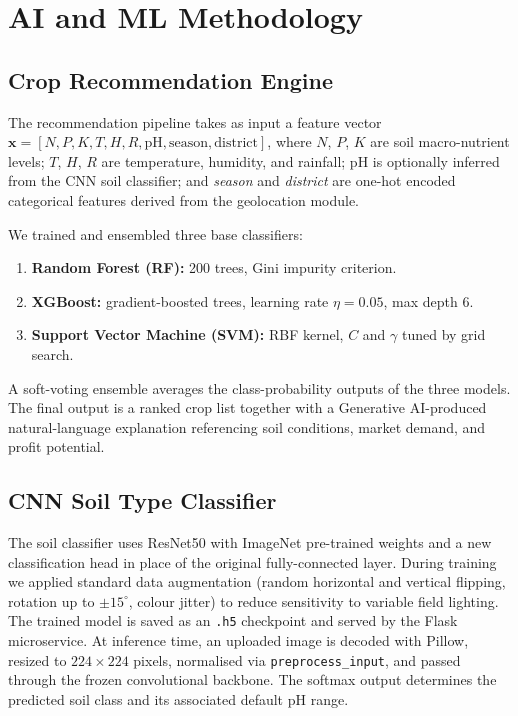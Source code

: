 \documentclass[conference]{IEEEtran}
\begin{document}
\section{AI and ML Methodology}

\subsection{Crop Recommendation Engine}
The recommendation pipeline takes as input a feature vector
$\mathbf{x} = [N, P, K, T, H, R, \text{pH}, \text{season}, \text{district}]$,
where $N$, $P$, $K$ are soil macro-nutrient levels; $T$, $H$, $R$ are
temperature, humidity, and rainfall; pH is optionally inferred from the CNN
soil classifier; and \textit{season} and \textit{district} are one-hot encoded
categorical features derived from the geolocation module.

We trained and ensembled three base classifiers:
\begin{enumerate}
  \item \textbf{Random Forest (RF):} 200 trees, Gini impurity criterion.
  \item \textbf{XGBoost:} gradient-boosted trees, learning rate
    $\eta = 0.05$, max depth 6.
  \item \textbf{Support Vector Machine (SVM):} RBF kernel, $C$ and
    $\gamma$ tuned by grid search.
\end{enumerate}

A soft-voting ensemble averages the class-probability outputs of the three
models. The final output is a ranked crop list together with a Generative
AI-produced natural-language explanation referencing soil conditions, market
demand, and profit potential.

\subsection{CNN Soil Type Classifier}
The soil classifier uses ResNet50 \cite{he2016} with ImageNet pre-trained
weights and a new classification head in place of the original
fully-connected layer. During training we applied standard data augmentation
(random horizontal and vertical flipping, rotation up to $\pm 15^\circ$,
colour jitter) to reduce sensitivity to variable field lighting. The trained
model is saved as an \texttt{.h5} checkpoint and served by the Flask
microservice. At inference time, an uploaded image is decoded with Pillow,
resized to $224 \times 224$ pixels, normalised via
\texttt{preprocess\_input}, and passed through the frozen convolutional
backbone. The softmax output determines the predicted soil class and its
associated default pH range.
\end{document}
